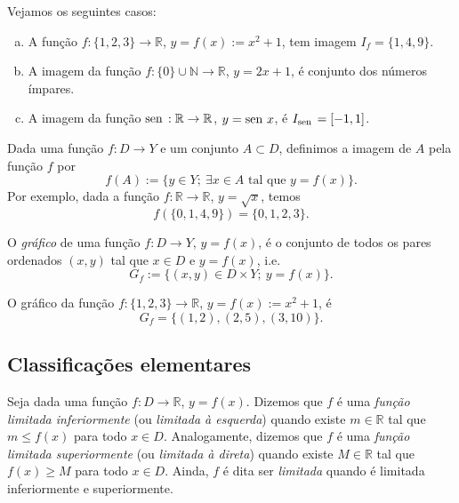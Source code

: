 \begin{ex}
  Vejamos os seguintes casos:
  \begin{enumerate}[a)]
  \item A função $f:\{1,2,3\}\to\mathbb{R}$, $y = f(x) := x^2 + 1$, tem imagem $I_f = \{1,4,9\}$.
  \item A imagem da função $f:\{0\}\cup\mathbb{N}\to\mathbb{R}$, $y = 2x+1$, é conjunto dos números ímpares.
  \item A imagem da função $\operatorname{sen}\,:\mathbb{R}\to\mathbb{R}$, $y=\operatorname{sen}\, x$, é $I_{\operatorname{sen}\,} = [-1, 1]$.
  \end{enumerate}
\end{ex}

\begin{obs}
  Dada uma função $f:D\to Y$ e um conjunto $A\subset D$, definimos a imagem de $A$ pela função $f$ por
  \begin{equation}
    f(A) := \{y\in Y;~\exists x\in A\text{ tal que }y=f(x)\}.
  \end{equation}
Por exemplo, dada a função $f:\mathbb{R}\to\mathbb{R}$, $y=\sqrt{x}$, temos
\begin{equation}
  f\left(\{0,1,4,9\}\right) = \{0,1,2,3\}.
\end{equation}
\end{obs}

\begin{defn} O \emph{gráfico} de uma função $f:D\to Y$, $y=f(x)$, é o conjunto de todos os pares ordenados $(x,y)$ tal que $x\in D$ e $y=f(x)$, i.e.
\begin{equation}
  G_f := \{(x, y)\in D\times Y;~y=f(x)\}.
\end{equation}
\end{defn}

\begin{ex}
  O gráfico da função $f:\{1,2,3\}\to\mathbb{R}$, $y = f(x) := x^2 + 1$, é
  \begin{equation}
    G_f = \{(1, 2), (2, 5), (3, 10)\}.
  \end{equation}
\end{ex}

\subsection{Classificações elementares}

\begin{defn}
  Seja dada uma função $f:D\to\mathbb{R}$, $y=f(x)$. Dizemos que $f$ é uma \emph{função limitada inferiormente} (ou \emph{limitada à esquerda}) quando existe $m\in \mathbb{R}$ tal que $m\leq f(x)$ para todo $x\in D$. Analogamente, dizemos que $f$ é uma \emph{função limitada superiormente} (ou \emph{limitada à direta}) quando existe $M\in \mathbb{R}$ tal que $f(x)\geq M$ para todo $x\in D$. Ainda, $f$ é dita ser \emph{limitada} quando é limitada inferiormente e superiormente.
\end{defn}


